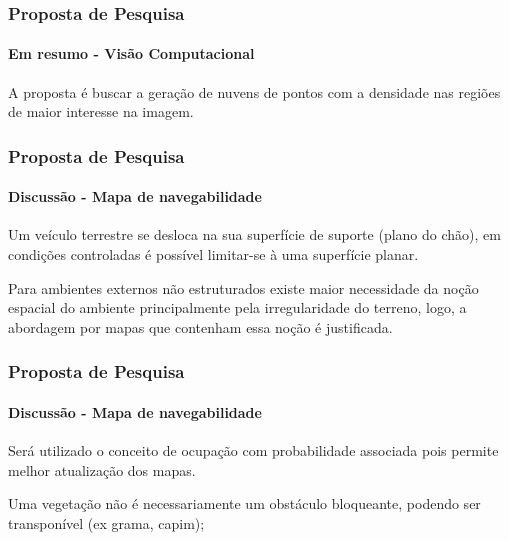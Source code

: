 \documentclass[brazil]{beamer}
\begin{document}

\begin{frame}
\frametitle{Proposta de Pesquisa}
\framesubtitle{Em resumo - Visão Computacional}
\begin{block}{}
A proposta é buscar a geração de nuvens de pontos com a densidade nas regiões de maior
interesse na imagem. 
\end{block}
\end{frame}

\begin{frame}
\frametitle{Proposta de Pesquisa}
\framesubtitle{Discussão - Mapa de navegabilidade}
\begin{block}{}
Um veículo terrestre se desloca na sua superfície de suporte (plano do chão), em condições controladas é
possível limitar-se à uma superfície planar.
\end{block}
\begin{block}{}
Para ambientes externos não estruturados existe maior necessidade da noção espacial 
do ambiente principalmente pela irregularidade do terreno, logo, a abordagem por mapas
que contenham essa noção é justificada. 
\end{block}
\end{frame}

\begin{frame}
\frametitle{Proposta de Pesquisa}
\framesubtitle{Discussão - Mapa de navegabilidade}
\begin{block}{}
Será utilizado o conceito de ocupação com probabilidade associada pois permite melhor atualização dos mapas.
\end{block}
\begin{block}{}
Uma vegetação não é necessariamente um obstáculo bloqueante, podendo ser transponível (ex grama, capim);
\end{block}
\end{frame}
\end{document}
